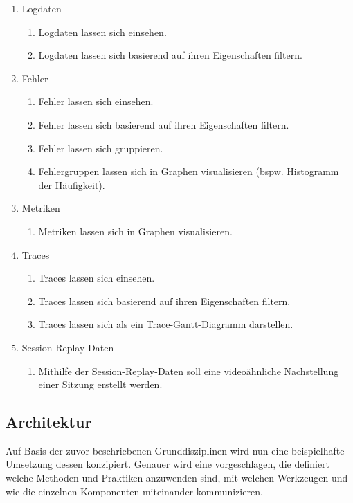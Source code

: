 	\begin{enumerate}
		\item Logdaten
		\begin{enumerate}
			\item Logdaten lassen sich einsehen.
			\item Logdaten lassen sich basierend auf ihren Eigenschaften filtern.
		\end{enumerate}
		\item Fehler
		\begin{enumerate}
			\item Fehler lassen sich einsehen.
			\item Fehler lassen sich basierend auf ihren Eigenschaften filtern.
			\item Fehler lassen sich gruppieren.
			\item Fehlergruppen lassen sich in Graphen visualisieren (bspw. Histogramm der Häufigkeit).
		\end{enumerate}
		\item Metriken
		\begin{enumerate}
			\item Metriken lassen sich in Graphen visualisieren.
		\end{enumerate}
		\item Traces
		\begin{enumerate}
			\item Traces lassen sich einsehen.
			\item Traces lassen sich basierend auf ihren Eigenschaften filtern.
			\item Traces lassen sich als ein Trace-Gantt-Diagramm darstellen.
		\end{enumerate}
		\item Session-Replay-Daten
		\begin{enumerate}
			\item Mithilfe der Session-Replay-Daten soll eine videoähnliche Nachstellung einer Sitzung erstellt werden.
		\end{enumerate}
	\end{enumerate}
	
	\subsection{Architektur}
	
	Auf Basis der zuvor beschriebenen Grunddisziplinen wird nun eine beispielhafte Umsetzung dessen konzipiert. Genauer wird eine vorgeschlagen, die definiert welche Methoden und Praktiken anzuwenden sind, mit welchen Werkzeugen und wie die einzelnen Komponenten miteinander kommunizieren.
	
